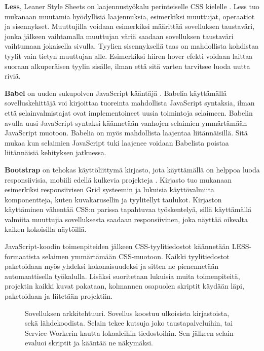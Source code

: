 \documentclass{tktltiki}
\begin{document}
\textbf{Less}, Leaner Style Sheets on laajennustyökalu perinteiselle CSS kielelle \cite{7476640}. Less tuo mukanaan muutamia hyödyllisiä laajennuksia, esimerkiksi muuttujat, operaatiot ja sisennykset. Muuttujilla voidaan esimerkiksi määrittää sovelluksen taustaväri, jonka jälkeen vaihtamalla muuttujan väriä saadaan sovelluksen taustaväri vaihtumaan jokaisella sivulla. Tyylien sisennyksellä taas on mahdollista kohdistaa tyylit vain tietyn muuttujan alle. Esimerkiksi hiiren hover efekti voidaan laittaa suoraan alkuperäisen tyylin sisälle, ilman että sitä varten tarvitsee luoda uutta riviä.

\textbf{Babel} on uuden sukupolven JavaScript kääntäjä \cite{maynard2017getting}. Babelia käyttämällä sovelluskehittäjä voi kirjoittaa tuoreinta mahdollista JavaScript syntaksia, ilman että selainvalmistajat ovat implementoineet uusia toimintoja selaimeen. Babelin avulla uusi JavaScript syntaksi käännetään vanhojen selaimien ymmärtämään JavaScript muotoon. Babelia on myös mahdollista laajentaa liitännäisillä. Sitä mukaa kun selaimien JavaScript tuki laajenee voidaan Babelista poistaa liitännäisiä kehityksen jatkuessa.

\textbf{Bootstrap} on tehokas käyttöliittymä kirjasto, jota käyttämällä on helppoa luoda responsiivisia, mobiili edellä kulkevia projekteja \cite{balasubramanee2013twitter}. Kirjasto tuo mukanaan esimerkiksi responsiivisen Grid systeemin ja lukuisia käyttövalmiita komponentteja, kuten kuvakarusellin ja tyylitellyt taulukot. Kirjaston käyttäminen vähentää CSS:n parissa tapahtuvaa työskentelyä, sillä käyttämällä valmiita muuttujia sovelluksesta saadaan responsiivinen, joka näyttää oikealta kaiken kokoisilla näytöillä.

JavaScript-koodin toimenpiteiden jälkeen CSS-tyylitiedostot käännetään LESS-formaatista selaimen ymmärtämään CSS-muotoon. Kaikki tyylitiedostot paketoidaan myös yhdeksi kokonaisuudeksi ja sitten ne pienennetään automaattisella työkalulla. Lisäksi suoritetaan lukuisia muita toimenpiteitä, projektin kaikki kuvat pakataan, kolmannen osapuolen skriptit käydään läpi, paketoidaan ja liitetään projektiin.

\begin{figure}[h]
\begin{center}
\caption{Sovelluksen arkkitehtuuri. Sovellus koostuu ulkoisista kirjastoista, sekä lähdekoodista. Selain tekee kutsuja joko taustapalveluihin, tai Service Workerin kautta lokaaleihin tiedostoihin. Sen jälkeen selain evaluoi skriptit ja kääntää ne näkymäksi.}
\label{angulararkkitehtuuri}
\end{center}
\end{figure}
\end{document}
